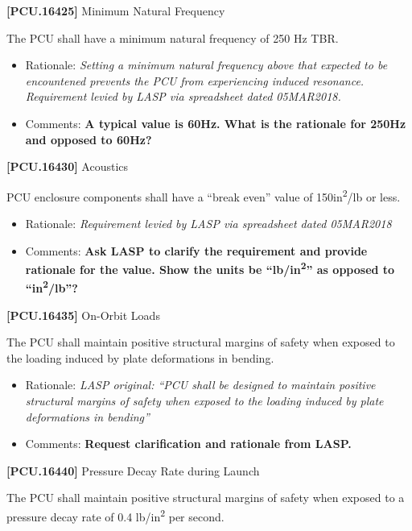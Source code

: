\documentclass[12pt,oneside,oldfontcommands]{memoir}
\begin{document}
\textbf{[PCU.16425]} Minimum Natural Frequency

The \gls{PCU} shall have a minimum natural frequency of 250 Hz TBR\label{tbx_13}.

\begin{itemize}
\item{} Rationale: \emph{Setting a minimum natural frequency above that expected to be encountened prevents the PCU from experiencing induced resonance. Requirement levied by LASP via spreadsheet dated 05MAR2018.}

\item{} Comments: \textbf{A typical value is 60Hz. What is the rationale for 250Hz and opposed to 60Hz?}

\end{itemize}

\textbf{[PCU.16430]} Acoustics

\gls{PCU} enclosure components shall have a ``break even'' value of 150in\textsuperscript{2}\slash lb or less.

\begin{itemize}
\item{} Rationale: \emph{Requirement levied by LASP via spreadsheet dated 05MAR2018}

\item{} Comments: \textbf{Ask LASP to clarify the requirement and provide rationale for the value. Show the units be ``lb\slash in\textsuperscript{2}'' as opposed to ``in\textsuperscript{2}\slash lb''?}

\end{itemize}

\textbf{[PCU.16435]} On-Orbit Loads

The \gls{PCU} shall maintain positive structural margins of safety when exposed to the loading induced by plate deformations in bending.

\begin{itemize}
\item{} Rationale: \emph{LASP original: ``PCU shall be designed to maintain positive structural margins of safety when exposed to the loading induced by plate deformations in bending''}

\item{} Comments: \textbf{Request clarification and rationale from LASP.}

\end{itemize}

\textbf{[PCU.16440]} Pressure Decay Rate during Launch

The \gls{PCU} shall maintain positive structural margins of safety when exposed to a pressure decay rate of 0.4 lb\slash in\textsuperscript{2} per second.
\end{document}
